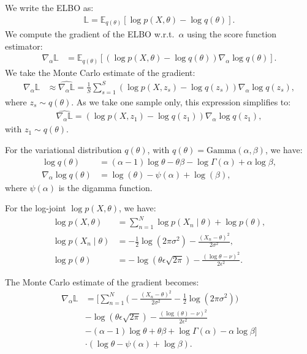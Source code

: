 \documentclass{article}
\begin{document}
\begin{multicols}{2}
    We write the ELBO as:
    \begin{align*}
        \mathbb{L} = \mathbb{E}_{q(\theta)}\left[\log p(X, \theta) - \log q(\theta)\right].
    \end{align*}
    We compute the gradient of the ELBO w.r.t.\ \(\alpha\) using the score function estimator:
    \begin{align*}
        \nabla_\alpha \mathbb{L} &= \mathbb{E}_{q(\theta)}\left[(\log p(X, \theta) - \log q(\theta)) \nabla_\alpha \log q(\theta) \right].
    \end{align*}
    We take the Monte Carlo estimate of the gradient:
    \begin{align*}
        \nabla_\alpha \mathbb{L} &\approx \widehat{\nabla_\alpha \mathbb{L}} = \frac{1}{S}\sum_{s=1}^{S}(\log p(X, z_s) - \log q(z_s)) \nabla_\alpha \log q(z_s),
    \end{align*}
    where \(z_s \sim q(\theta)\). As we take one sample only, this expression simplifies to:
    \begin{align*}
        \widehat{\nabla_\alpha \mathbb{L}} = (\log p(X, z_1) - \log q(z_1)) \nabla_\alpha \log q(z_1),
    \end{align*}
    with \(z_1 \sim q(\theta)\).

    For the variational distribution \(q(\theta)\), with \(q(\theta) = \text{Gamma}(\alpha, \beta)\), we have:
    \begin{align*}
        \log q(\theta) &= (\alpha - 1)\log \theta - \theta \beta - \log \Gamma(\alpha) + \alpha \log \beta, \\
        \nabla_\alpha \log q(\theta) &= \log(\theta) - \psi(\alpha) + \log(\beta),
    \end{align*}
    where \(\psi(\alpha)\) is the digamma function.

    For the log-joint \(\log p(X, \theta)\), we have:
    \begin{align*}
        \log p(X, \theta) &= \sum_{n=1}^{N} \log p(X_n \mid \theta) + \log p(\theta), \\
        \log p(X_n \mid \theta) &= -\frac{1}{2} \log(2\pi\sigma^2) - \frac{(X_n - \theta)^2}{2\sigma^2}, \\
        \log p(\theta) &= -\log(\theta \epsilon \sqrt{2\pi}) - \frac{(\log \theta - \nu)^2}{2\epsilon^2}.
    \end{align*}

    The Monte Carlo estimate of the gradient becomes:
    \begin{align*}
        \widehat{\nabla_\alpha \mathbb{L}} &= \Bigg[\sum_{n=1}^N \Big(-\frac{(X_n - \theta)^2}{2\sigma^2} - \frac{1}{2} \log(2\pi\sigma^2)\Big) \\&
        - \log(\theta \epsilon \sqrt{2\pi}) - \frac{(\log(\theta) - \nu)^2}{2\epsilon^2} \\
        &- (\alpha - 1)\log \theta + \theta \beta + \log \Gamma(\alpha) - \alpha \log \beta \Bigg]\\& \cdot (\log \theta - \psi(\alpha) + \log \beta).
    \end{align*}


\end{multicols}
\end{document}
